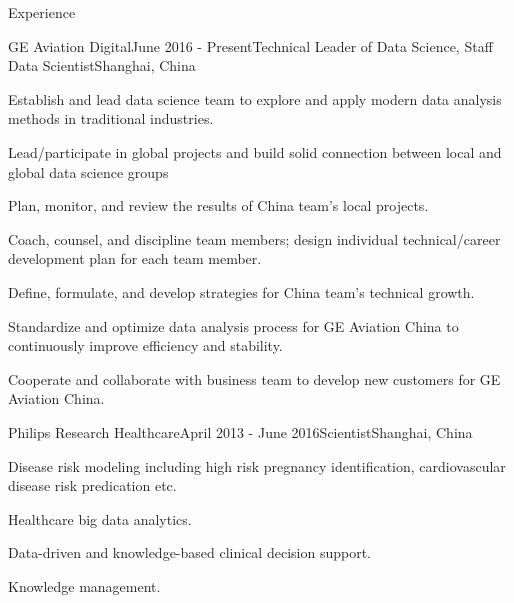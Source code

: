 \documentclass{resume} %
\begin{document}
\begin{rSection}{Experience}

\begin{rSubsection}{GE Aviation Digital}{June 2016 - Present}{Technical Leader of Data Science, Staff Data Scientist}{Shanghai, China}
\item Establish and lead data science team to explore and apply modern data analysis methods in traditional industries.
\item Lead/participate in global projects and build solid connection between local and global data science groups
\item Plan, monitor, and review the results of China team's local projects.
\item Coach, counsel, and discipline team members; design individual technical/career development plan for each team member.
\item Define, formulate, and develop strategies for China team's technical growth.
\item Standardize and optimize data analysis process for GE Aviation China to continuously improve efficiency and stability.
\item Cooperate and collaborate with business team to develop new customers for GE Aviation China.
\end{rSubsection}


\begin{rSubsection}{Philips Research Healthcare}{April 2013 - June 2016}{Scientist}{Shanghai, China}
\item Disease risk modeling including high risk pregnancy identification, cardiovascular disease risk predication etc.
\item Healthcare big data analytics.
\item Data-driven and knowledge-based clinical decision support.
\item Knowledge management.
\end{rSubsection}


\end{rSection}

\end{document}
